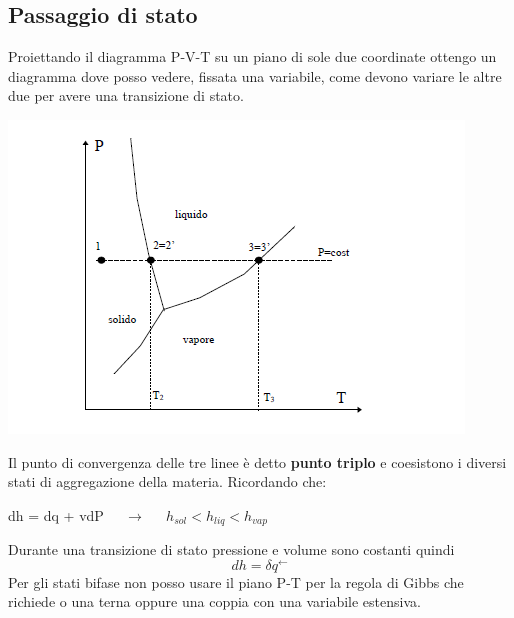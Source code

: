 \documentclass[a4paper,12pt,titlepage]{article}
\begin{document}
\subsection{Passaggio di stato}
Proiettando il diagramma P-V-T su un piano di sole due coordinate ottengo un diagramma dove posso vedere, fissata una variabile, come devono variare le altre due per avere una transizione di stato.
\begin{center}
\includegraphics[scale=0.6]{state_trans}
\end{center}
Il punto di convergenza delle tre linee è detto \textbf{punto triplo} e coesistono i diversi stati di aggregazione della materia. Ricordando che:
\begin{center}
dh = dq + vdP $\;\;\;\;\rightarrow \;\;\;\;$ $h_{sol}<h_{liq}<h_{vap}$
\end{center}
Durante una transizione di stato pressione e volume sono costanti quindi $$dh = \delta q^{\leftarrow}$$
Per gli stati bifase non posso usare il piano P-T per la regola di Gibbs che richiede o una terna oppure una coppia con una variabile estensiva.
 
\end{document}
